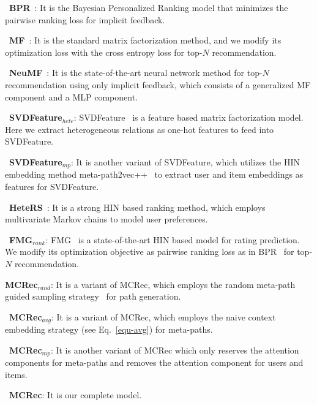 \textbullet\ \textbf{BPR}~\cite{rendle2009bpr}: It is the Bayesian  Personalized Ranking model that minimizes the pairwise ranking loss for implicit feedback.

\textbullet\ \textbf{MF}~\cite{koren2009matrix}: It is the standard matrix factorization method, and we modify its optimization loss with the cross entropy loss \cite{he2017neural} for top-$N$ recommendation.

\textbullet\ \textbf{NeuMF}~\cite{he2017neural}: It is the state-of-the-art neural network method for top-$N$ recommendation using only implicit feedback, which consists of a generalized MF component and a MLP component.

\textbullet\ \textbf{SVDFeature$_{hete}$}: SVDFeature~\cite{chen2012svdfeature} is a feature based matrix factorization model. Here we extract heterogeneous relations as one-hot features to feed into SVDFeature.

\textbullet\ \textbf{SVDFeature$_{mp}$}: It is another variant of SVDFeature, which utilizes the HIN embedding method meta-path2vec++~\cite{dong2017metapath2vec} to extract user and item embeddings as features for SVDFeature.

\textbullet\ \textbf{HeteRS}~\cite{pham2016general}: It is a strong HIN based ranking method, which employs multivariate Markov chains to model user preferences.

\textbullet\ \textbf{FMG$_{rank}$}: FMG~\cite{zhao2017meta} is a state-of-the-art HIN based model for rating prediction. We modify its optimization objective as pairwise ranking loss as in BPR~\cite{rendle2009bpr} for top-$N$ recommendation.

\textbullet \textbf{MCRec$_{rand}$}: It is a variant of MCRec, which employs the random meta-path guided sampling strategy~\cite{dong2017metapath2vec} for path generation.

\textbullet\ \textbf{MCRec$_{avg}$}: It is a variant of MCRec, which employs the naive context embedding strategy (see Eq.~\ref{equ-avg}) for meta-paths.

\textbullet\ \textbf{MCRec$_{mp}$}: It is another variant of MCRec which only reserves the attention components for meta-paths and removes the attention component for users and items.

\textbullet\ \textbf{MCRec}: It is our complete model.



